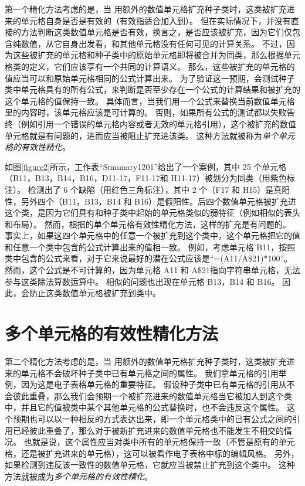 第一个精化方法考虑的是，当 \wa 用额外的数值单元格扩充种子类时，这类被扩充进来的单元格自身是否是有效的（有效指适合加入到）。
但在实际情况下，并没有直接的方法判断这类数值单元格是否有效，换言之，是否应该被扩充，因为它们仅包含纯数值，从它自身出发看，和其他单元格没有任何可见的计算关系。
不过，因为这些被扩充的单元格和种子类中的原始单元格即将被合并为同类，那么根据单元格类的定义，它们应该享有一个共同的计算语义。
那么，这些被扩充的单元格的值应当可以和原始单元格相同的公式计算出来。
为了验证这一预期，\wa 会测试种子类中单元格具有的所有公式，来判断是否至少存在一个公式的计算结果和被扩充的这个单元格的值保持一致。
具体而言，当我们用一个公式来替换当前数值单元格里的内容时，该单元格应该是可计算的。
否则，如果所有公式的测试都以失败告终（例如引用一个错误的单元格内容或者无效的单元格引用），这个被扩充的数值单元格就是有问题的，进而应当被阻止扩充进该类。
这种方法就被称为\textit{单个单元格的有效性精化}。

如图\ref{figure2}所示，工作表“Summary1201”给出了一个案例，其中 25 个单元格（B11，B13，B14，B16，D11-17，F11-17和 H11-17）被\cu 划分为同类（用紫色标注）。
\cu 检测出了 6 个缺陷（用红色三角标注），其中 2 个（F17 和 H15）是真阳性，另外四个（B11，B13，B14 和 B16）是假阳性。后四个数值单元格被扩充进这个类，是因为它们具有和种子类中起始的单元格类似的弱特征（例如相似的表头和布局）。
然而，根据\wa 的单个单元格有效性精化方法，这样的扩充是有问题的。
事实上，如果这四个单元格中的任意一个被扩充到这个类中，这个单元格把它的值和任意一个类中包含的公式计算出来的值相一致。
例如，考虑单元格 B11，按照类中包含的公式来看，对于它来说最好的潜在公式应该是“=(A11/A\$21)*100”。
然而，这个公式是不可计算的，因为单元格 A11 和 A\$21指向字符串单元格，无法参与这类除法算数运算中。
相似的问题也出现在单元格 B13，B14 和 B16。 
因此，\wa 会防止这类数值单元格被扩充到类中。

\section{多个单元格的有效性精化方法}



第二个精化方法考虑的是，当 \wa 用额外的数值单元格扩充种子类时，这类被扩充进来的单元格不会破坏种子类中已有单元格之间的属性。
我们拿单元格的引用举例，因为这是电子表格单元格的重要特征。
假设种子类中已有单元格的引用从不会彼此重叠，那么我们会预期一个被扩充进来的数值单元格当它被加入到这个类中，并且它的值被类中某个其他单元格的公式替换时，也不会违反这个属性。
这个预期也可以以一种相反的方式表达出来，即一个单元格类中的已有公式之间的引用已经彼此重叠了，那么对于被新扩充进来的数值单元格也不能发生不相交的情况。
也就是说，这个属性应当对类中所有的单元格保持一致（不管是原有的单元格，还是被扩充进来的单元格），这可以被看作电子表格中标的编辑风格。
另外，如果检测到违反该一致性的数值单元格，它就应当被禁止扩充到这个类中。
这种方法就被成为\textit{多个单元格的有效性精化}。

